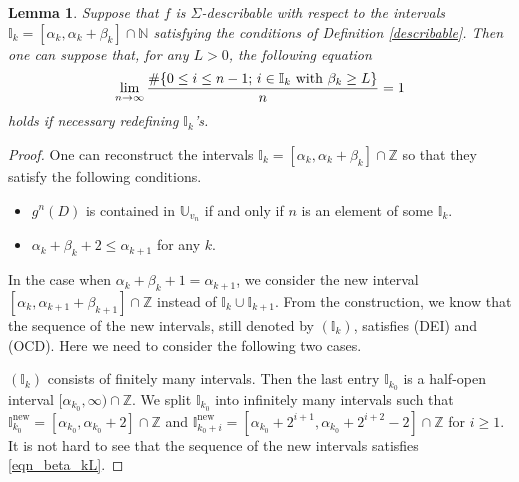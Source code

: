 \documentclass{amsart}
\newtheorem{lem}[thm]{Lemma}
\theoremstyle{definition}
\numberwithin{equation}{section}
\numberwithin{figure}{section}
\def\setl{\setlength{\leftskip}{-18pt}}
\begin{document}
\begin{lem}\label{l_beta_kL}
Suppose that $f$ is $\Sigma$-describable with respect to the intervals ${\mathbb{I}}_k=[\alpha_k,\alpha_k+\beta_k]\cap \mathbb{N}$ 
satisfying the conditions of Definition \ref{describable}.
Then one can suppose that, for any $L>0$, the following equation
\begin{equation}\label{eqn_beta_kL}
\lim_{n\rightarrow\infty}\frac{\#\{0\leq i\leq n-1;\, i\in {\mathbb{I}}_k \text{\rm\ with $\beta_k\geq L$}\}}{n}=1
\end{equation}
holds if necessary redefining ${\mathbb{I}}_k$'s.
\end{lem}
\begin{proof}
One can reconstruct the intervals ${\mathbb{I}}_k=[\alpha_k, \alpha_k+\beta_k]\cap \mathbb{Z}$ so that they satisfy the following conditions. 
\begin{itemize}
\setl
\item
$g^n(D)$ is contained in ${\mathbb{U}}_{v_n}$ if and only if $n$ is an element of some ${\mathbb{I}}_k$.
\item
$\alpha_k+\beta_k+2\leq \alpha_{k+1}$ for any $k$.
\end{itemize}
In the case when $\alpha_k+\beta_k+1=\alpha_{k+1}$, we consider the new interval $[\alpha_k,\alpha_{k+1}+\beta_{k+1}]\cap \mathbb{Z}$ instead of ${\mathbb{I}}_k\cup {\mathbb{I}}_{k+1}$.
From the construction, we know that the sequence of the new intervals, still denoted by $({\mathbb{I}}_k)$, satisfies (DEI) and (OCD).
Here we need to consider the following two cases.

\smallskip

 $({\mathbb{I}}_k)$ consists of finitely many intervals. 
Then the last entry ${\mathbb{I}}_{k_0}$ is a half-open interval $[\alpha_{k_0},\infty)\cap \mathbb{Z}$.
 We split ${\mathbb{I}}_{k_0}$ into infinitely many intervals such that 
 ${\mathbb{I}}_{k_0}^{\mathrm{new}}=[\alpha_{k_0},\alpha_{k_0}+2]\cap \mathbb{Z}$ and 
 ${\mathbb{I}}_{k_0+i}^{\mathrm{new}}=[\alpha_{k_0}+2^{i+1},\alpha_{k_0}+2^{i+2}-2]\cap \mathbb{Z}$ for $i\geq 1$.
 It is not hard to see that the sequence of the new intervals satisfies \eqref{eqn_beta_kL}.
  
\smallskip


\end{proof}
\end{document}
